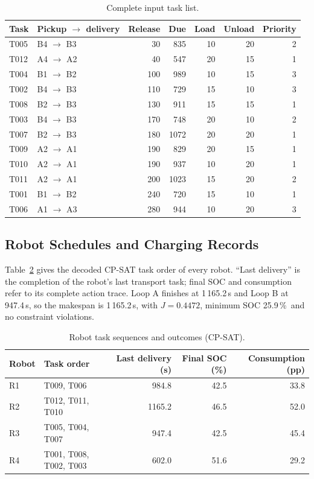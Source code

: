 \documentclass[11pt,a4paper]{article}
\newcommand{\pct}{\,\%}
\begin{document}
\begin{table}[!htbp]
\centering\small
\caption{Complete input task list.}
\label{tab:tasklist}
\begin{tabular}{llrrrrr}
\toprule
Task & Pickup $\to$ delivery & Release & Due & Load & Unload & Priority \\
\midrule
T005 & B4 $\to$ B3 & 30 & 835 & 10 & 20 & 2 \\
T012 & A4 $\to$ A2 & 40 & 547 & 20 & 15 & 1 \\
T004 & B1 $\to$ B2 & 100 & 989 & 10 & 15 & 3 \\
T002 & B4 $\to$ B3 & 110 & 729 & 15 & 10 & 3 \\
T008 & B2 $\to$ B3 & 130 & 911 & 15 & 15 & 1 \\
T003 & B4 $\to$ B3 & 170 & 748 & 20 & 10 & 2 \\
T007 & B2 $\to$ B3 & 180 & 1072 & 20 & 20 & 1 \\
T009 & A2 $\to$ A1 & 190 & 829 & 20 & 15 & 1 \\
T010 & A2 $\to$ A1 & 190 & 937 & 10 & 20 & 1 \\
T011 & A2 $\to$ A1 & 200 & 1023 & 15 & 20 & 2 \\
T001 & B1 $\to$ B2 & 240 & 720 & 15 & 10 & 1 \\
T006 & A1 $\to$ A3 & 280 & 944 & 10 & 20 & 3 \\
\bottomrule
\end{tabular}
\end{table}

\subsection{Robot Schedules and Charging Records}

Table~\ref{tab:sequences} gives the decoded CP-SAT task order of every robot. ``Last delivery'' is the
completion of the robot's last transport task; final SOC and consumption refer to its complete action
trace. Loop A finishes at 1\,165.2\,s and Loop B at 947.4\,s, so the makespan is 1\,165.2\,s, with
$J = 0.4472$, minimum SOC 25.9\pct\ and no constraint violations.

\begin{table}[!htbp]
\centering\small
\caption{Robot task sequences and outcomes (CP-SAT).}
\label{tab:sequences}
\begin{tabular}{llrrr}
\toprule
Robot & Task order & Last delivery (s) & Final SOC (\%) & Consumption (pp) \\
\midrule
R1 & T009, T006 & 984.8 & 42.5 & 33.8 \\
R2 & T012, T011, T010 & 1165.2 & 46.5 & 52.0 \\
R3 & T005, T004, T007 & 947.4 & 42.5 & 45.4 \\
R4 & T001, T008, T002, T003 & 602.0 & 51.6 & 29.2 \\
\bottomrule
\end{tabular}
\end{table}
\end{document}
